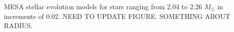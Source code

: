 \label{fig:mesa} MESA stellar evolution models for stars ranging from 2.04 to 2.26 $M_{\odot}$ in increments of 0.02. NEED TO UPDATE FIGURE. SOMETHING ABOUT RADIUS.
    